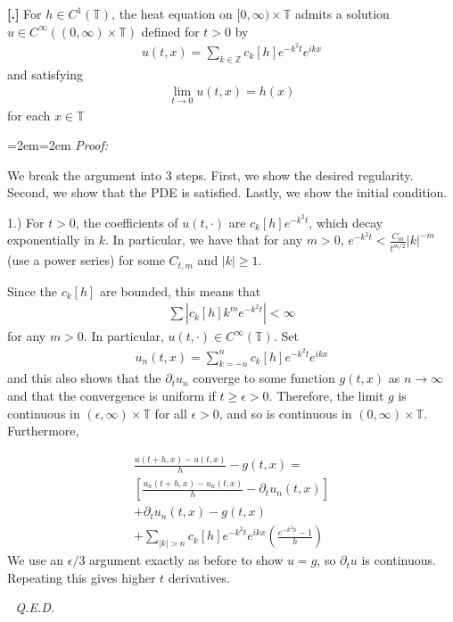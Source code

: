 \documentclass{article}
\newcommand{\Z}{{\mathbb{Z}}}
\newcommand{\bT}{\mathbb{T}}
\newcommand{\pd}{\partial}
\newcounter{result}[section]
\newenvironment{res}[1][]{\refstepcounter{result}\par\medskip
	\noindent \textbf{[\thesection.\theresult] #1} \rmfamily}{\medskip}
\newenvironment{pf}{%
	\par%
	\medskip
	\leftskip=2em\rightskip=2em%
	\noindent\ignorespaces \textit{Proof:} \newline}{%
	\,\, \newline \textit{Q.E.D.}\par\medskip}
\begin{document}
	\begin{res}
	For $h \in C^{1}(\bT)$, the heat equation on $[0,\infty) \times \bT$ admits a solution $u \in C^{\infty}((0,\infty) \times \bT)$ defined for $t>0$ by 
	\begin{align*}
		u(t,x) = \sum_{k \in \Z} c_{k}[h] e^{-k^{2}t}e^{ikx}
	\end{align*}
	and satisfying 
	\begin{align*}
		\lim_{t \to 0} u(t,x) = h(x)
	\end{align*}
	for each $x \in \bT$
	\end{res}
	\begin{pf}
		
		We break the argument into 3 steps. First, we show the desired regularity. Second, we show that the PDE is satisfied. Lastly, we show the initial condition. 
		
		1.) For $t>0$, the coefficients of $u(t,\cdot)$ are $c_{k}[h] e^{-k^{2}t}$, which decay exponentially in $k$. In particular, we have that for any $m>0$, $e^{-k^{2}t} < \frac{C_{m}}{t^{m/2}}|k|^{-m}$ (use a power series) for some $C_{t,m}$ and $|k| \geq 1$.
		
		Since the $c_{k}[h]$ are bounded, this means that 
		\begin{align*}
			\sum |c_{k}[h] k^{m} e^{-k^{2}t} | < \infty
		\end{align*}
		for any $m>0$. In particular, $u(t,\cdot) \in C^{\infty}(\bT)$. Set 
		\begin{align*}
			u_{n}(t,x) = \sum_{k=-n}^{n} c_{k}[h] e^{-k^{2}t}e^{ikx}
		\end{align*}
		and this also shows that the $\pd_{t} u_{n}$ converge to some function $g(t,x)$ as $n \to \infty$ and that the convergence is uniform if $t \geq \epsilon > 0$. Therefore, the limit $g$ is continuous in $(\epsilon,\infty) \times \bT$ for all $\epsilon > 0$, and so is continuous in $(0,\infty) \times \bT$. Furthermore,
		
		\begin{align*}
			\frac{u(t+h,x) - u(t,x)}{h} -g(t,x) = \\
			\left[\frac{u_{n}(t+h,x) - u_n(t,x)}{h} - \pd_{t}u_{n}(t,x) \right] \\
			+ \pd_{t}u_{n}(t,x) - g(t,x)\\
			+ \sum_{|k| > n} c_{k}[h]e^{-k^{2}t}e^{ikx} \left( \frac{e^{-k^{2}h}-1}{h}\right)
		\end{align*}
		We use an $\epsilon/3$ argument exactly as before to show $u = g$, so $\pd_{t} u $ is continuous. Repeating this gives higher $t$ derivatives. 
		

\end{pf}
\end{document}
